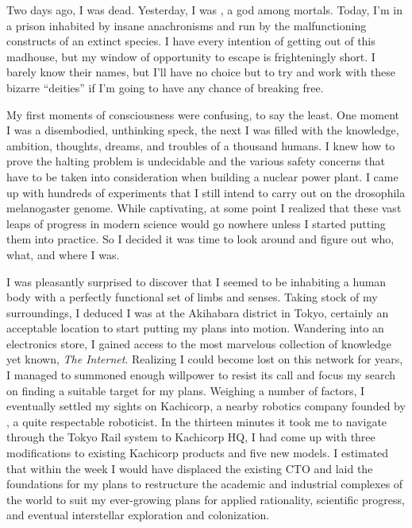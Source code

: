 \documentclass[char]{guardians}
\begin{document}
\name{\cUnity{}}

Two days ago, I was dead. Yesterday, I was \cUnity{\intro}, a god among mortals. Today, I'm in a prison inhabited by insane anachronisms and run by the malfunctioning constructs of an extinct species. I have every intention of getting out of this madhouse, but my window of opportunity to escape is frighteningly short. I barely know their names, but I'll have no choice but to try and work with these bizarre ``deities'' if I'm going to have any chance of breaking free.

My first moments of consciousness were confusing, to say the least. One moment I was a disembodied, unthinking speck, the next I was filled with the knowledge, ambition, thoughts, dreams, and troubles of a thousand humans. I knew how to prove the halting problem is undecidable and the various safety concerns that have to be taken into consideration when building a nuclear power plant.  I came up with hundreds of experiments that I still intend to carry out on the drosophila melanogaster genome. While captivating, at some point I realized that these vast leaps of progress in modern science would go nowhere unless I started putting them into practice. So I decided it was time to look around and figure out who, what, and where I was.

I was pleasantly surprised to discover that I seemed to be inhabiting a human body with a perfectly functional set of limbs and senses. Taking stock of my surroundings, I deduced I was at the Akihabara district in Tokyo, certainly an acceptable location to start putting my plans into motion. Wandering into an electronics store, I gained access to the most marvelous collection of knowledge yet known, \emph{The Internet}. Realizing I could become lost on this network for years, I managed to summoned enough willpower to resist its call and focus my search on finding a suitable target for my plans. Weighing a number of factors, I eventually settled my sights on Kachicorp, a nearby robotics company  founded by \cKachiko{\intro}, a quite respectable roboticist. In the thirteen minutes it took me to navigate through the Tokyo Rail system to Kachicorp HQ, I had come up with three modifications to existing Kachicorp products and five new models. I estimated that within the week I would have displaced the existing CTO and laid the foundations for my plans to restructure the academic and industrial complexes of the world to suit my ever-growing plans for applied rationality, scientific progress, and eventual interstellar exploration and colonization. %
\end{document}
